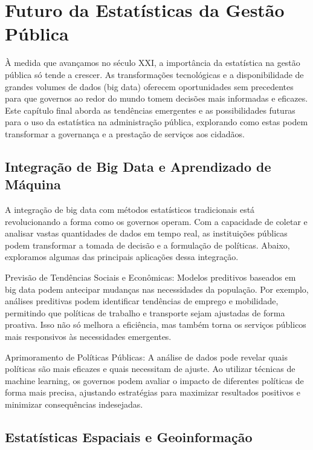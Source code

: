 \chapter{Futuro da Estatísticas da Gestão Pública}

À medida que avançamos no século XXI, a importância da estatística na gestão pública só tende a crescer. As transformações tecnológicas e a disponibilidade de grandes volumes de dados (big data) oferecem oportunidades sem precedentes para que governos ao redor do mundo tomem decisões mais informadas e eficazes. Este capítulo final aborda as tendências emergentes e as possibilidades futuras para o uso da estatística na administração pública, explorando como estas podem transformar a governança e a prestação de serviços aos cidadãos.\vskip0.3cm

\section{Integração de Big Data e Aprendizado de Máquina}

A integração de big data com métodos estatísticos tradicionais está revolucionando a forma como os governos operam. Com a capacidade de coletar e analisar vastas quantidades de dados em tempo real, as instituições públicas podem transformar a tomada de decisão e a formulação de políticas. Abaixo, exploramos algumas das principais aplicações dessa integração.\vskip0.3cm

Previsão de Tendências Sociais e Econômicas: Modelos preditivos baseados em big data podem antecipar mudanças nas necessidades da população. Por exemplo, análises preditivas podem identificar tendências de emprego e mobilidade, permitindo que políticas de trabalho e transporte sejam ajustadas de forma proativa. Isso não só melhora a eficiência, mas também torna os serviços públicos mais responsivos às necessidades emergentes.\vskip0.3cm

Aprimoramento de Políticas Públicas: A análise de dados pode revelar quais políticas são mais eficazes e quais necessitam de ajuste. Ao utilizar técnicas de machine learning, os governos podem avaliar o impacto de diferentes políticas de forma mais precisa, ajustando estratégias para maximizar resultados positivos e minimizar consequências indesejadas.


\section{Estatísticas Espaciais e Geoinformação}

